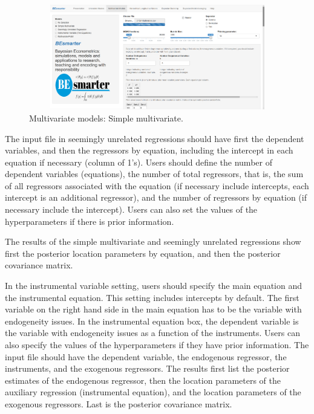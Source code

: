 \begin{figure}
	\includegraphics[width=340pt, height=130pt]{Chapters/chapterGUI/figures/Figure6.png}
	\caption[List of figure caption goes here]{Multivariate models: Simple multivariate.}\label{fig66}
\end{figure}

The input file in seemingly unrelated regressions should have first the dependent variables, and then the regressors by equation, including the intercept in each equation if necessary (column of 1's). Users should define the number of dependent variables (equations), the number of total regressors, that is, the sum of all regressors associated with the equation (if necessary include intercepts, each intercept is an additional regressor), and the number of regressors by equation (if necessary include the intercept). Users can also set the values  of the hyperparameters if there is prior information.

The results of the simple multivariate and seemingly unrelated regressions show first the posterior location parameters by equation, and then the posterior covariance matrix.

In the instrumental variable setting, users should specify the main equation and the instrumental equation. This setting includes intercepts by default. The first variable on the right hand side in the main equation has to be the variable with endogeneity issues. In the instrumental equation box, the dependent variable is the variable with endogeneity issues as a function of the instruments. Users can also specify the values of the hyperparameters if they have prior information. The input file should have the dependent variable, the endogenous regressor, the instruments, and the exogenous regressors. The results first list the posterior estimates of the endogenous regressor, then the location parameters of the auxiliary regression (instrumental equation), and the location parameters of the exogenous regressors. Last is the posterior covariance matrix.

